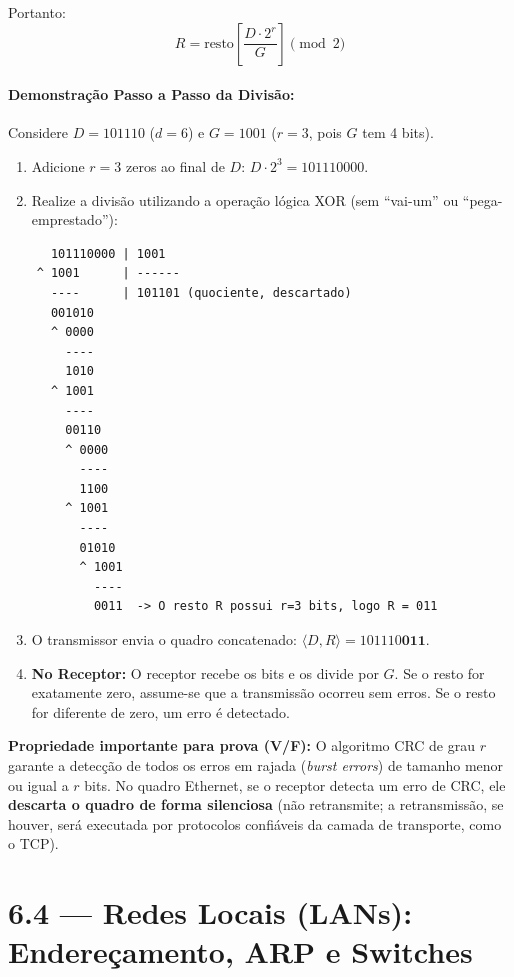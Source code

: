 \documentclass[11pt,a4paper]{article}
\begin{document}
Portanto:
\[
R = \text{resto}\left[ \frac{D \cdot 2^r}{G} \right] \pmod 2
\]

\paragraph{Demonstração Passo a Passo da Divisão:}
Considere $D = 101110$ ($d=6$) e $G = 1001$ ($r=3$, pois $G$ tem 4 bits).

\begin{enumerate}
    \item Adicione $r=3$ zeros ao final de $D$: $D \cdot 2^3 = 101110000$.
    \item Realize a divisão utilizando a operação lógica XOR (sem ``vai-um'' ou ``pega-emprestado''):
\end{enumerate}

\begin{verbatim}
      101110000 | 1001
    ^ 1001      | ------
      ----      | 101101 (quociente, descartado)
      001010
      ^ 0000
        ----
        1010
      ^ 1001
        ----
        00110
        ^ 0000
          ----
          1100
        ^ 1001
          ----
          01010
          ^ 1001
            ----
            0011  -> O resto R possui r=3 bits, logo R = 011
\end{verbatim}

\begin{enumerate}
    \setcounter{enumi}{2}
    \item O transmissor envia o quadro concatenado: $\langle D, R \rangle = 101110\mathbf{011}$.
    \item \textbf{No Receptor:} O receptor recebe os bits e os divide por $G$. Se o resto for exatamente zero, assume-se que a transmissão ocorreu sem erros. Se o resto for diferente de zero, um erro é detectado.
\end{enumerate}

\begin{nota}
\textbf{Propriedade importante para prova (V/F):} O algoritmo CRC de grau $r$ garante a detecção de todos os erros em rajada (\emph{burst errors}) de tamanho menor ou igual a $r$ bits. No quadro Ethernet, se o receptor detecta um erro de CRC, ele \textbf{descarta o quadro de forma silenciosa} (não retransmite; a retransmissão, se houver, será executada por protocolos confiáveis da camada de transporte, como o TCP).
\end{nota}

\hrulefill

\section{6.4 --- Redes Locais (LANs): Endereçamento, ARP e Switches}
\end{document}
